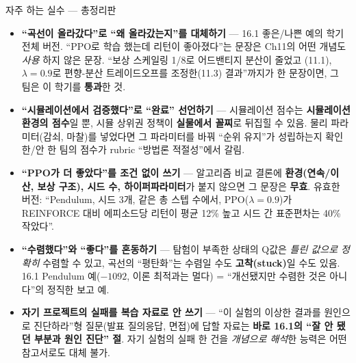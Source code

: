 \documentclass[aspectratio=169,11pt]{beamer}
\begin{document}
\begin{frame}{자주 하는 실수 — 총정리판}
  \small
  \begin{itemize}
    \item \textbf{``곡선이 올라갔다''로 ``왜 올라갔는지''를
      대체하기} — 16.1 좋은/나쁜 예의 학기 전체 버전. ``PPO로 학습
      했는데 리턴이 좋아졌다''는 문장은 Ch11의 어떤 개념도 \emph{사용}
      하지 않은 문장. ``보상 스케일링 1/8로 어드밴티지 분산이 줄었고
      (11.1), $\lambda=0.9$로 편향-분산 트레이드오프를 조정한(11.3)
      결과''까지가 한 문장이면, 그 팀은 이 학기를 \textbf{통과}한
      것.
    \item \textbf{``시뮬레이션에서 검증했다''로 ``완료'' 선언하기} —
      시뮬레이션 점수는 \textbf{시뮬레이션 환경의 점수}일 뿐, 시뮬
      상위권 정책이 \textbf{실물에서 꼴찌}로 뒤집힐 수 있음.
      물리 파라미터(감쇠, 마찰)를 넣었다면 그 파라미터를 바꿔 ``순위
      유지''가 성립하는지 확인한/안 한 팀의 점수가 rubric ``방법론
      적절성''에서 갈림.
    \item \textbf{``PPO가 더 좋았다''를 조건 없이 쓰기} — 알고리즘
      비교 결론에 \textbf{환경(연속/이산, 보상 구조), 시드 수,
      하이퍼파라미터}가 붙지 않으면 그 문장은 \textbf{무효}. 유효한
      버전: ``Pendulum, 시드 3개, 같은 총 스텝 수에서, PPO($\lambda
      =0.9$)가 REINFORCE 대비 에피소드당 리턴이 평균 12\% 높고 시드
      간 표준편차는 40\% 작았다''.
    \item \textbf{``수렴했다''와 ``좋다''를 혼동하기} — 탐험이
      부족한 상태의 Q값은 \emph{틀린 값으로 정확히} 수렴할 수 있고,
      곡선의 ``평탄화''는 수렴일 수도 \textbf{고착(stuck)}일 수도
      있음. 16.1 Pendulum 예($-1092$, 이론 최적과는 멀다) =
      ``개선됐지만 수렴한 것은 아니다''의 정직한 보고 예.
    \item \textbf{자기 프로젝트의 실패를 복습 자료로 안 쓰기} —
      ``이 실험의 이상한 결과를 원인으로 진단하라''형 질문(발표
      질의응답, 면접)에 답할 자료는 \textbf{바로 16.1의 ``잘 안
      됐던 부분과 원인 진단'' 절}. 자기 실험의 실패 한 건을
      \emph{개념으로 해석}한 능력은 어떤 참고서로도 대체 불가.
  \end{itemize}
\end{frame}
\end{document}
